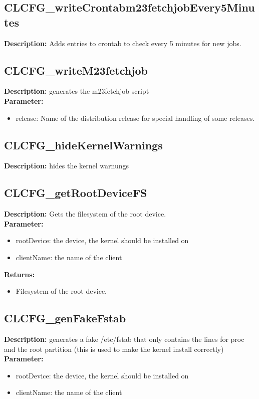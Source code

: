 \subsection{CLCFG\_writeCrontabm23fetchjobEvery5Minutes}
\textbf{Description:} Adds entries to crontab to check every 5 minutes for new jobs.\\

\subsection{CLCFG\_writeM23fetchjob}
\textbf{Description:} generates the m23fetchjob script\\
\textbf{Parameter:}
\begin{itemize}
\item release: Name of the distribution release for special handling of some releases.
\end{itemize}

\subsection{CLCFG\_hideKernelWarnings}
\textbf{Description:} hides the kernel warnungs\\

\subsection{CLCFG\_getRootDeviceFS}
\textbf{Description:} Gets the filesystem of the root device.\\
\textbf{Parameter:}
\begin{itemize}
\item rootDevice: the device, the kernel should be installed on
\item clientName: the name of the client
\end{itemize}
\textbf{Returns:}
\begin{itemize}
\item Filesystem of the root device.
\end{itemize}

\subsection{CLCFG\_genFakeFstab}
\textbf{Description:} generates a fake /etc/fstab that only contains the lines for proc and the root partition (this is used to make the kernel install correctly)\\
\textbf{Parameter:}
\begin{itemize}
\item rootDevice: the device, the kernel should be installed on
\item clientName: the name of the client
\end{itemize}

